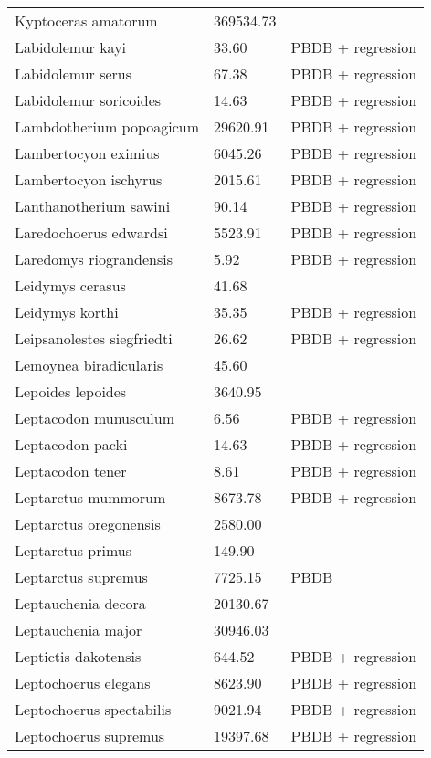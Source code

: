 \documentclass{article}
\begin{document}
\begin{center}
\begin{longtable}{p{} p{} p{} }
  Kyptoceras amatorum & 369534.73 & \cite{Tomiya2013} \\ 
  Labidolemur kayi & 33.60 & PBDB + regression \\ 
  Labidolemur serus & 67.38 & PBDB + regression \\ 
  Labidolemur soricoides & 14.63 & PBDB + regression \\ 
  Lambdotherium popoagicum & 29620.91 & PBDB + regression \\ 
  Lambertocyon eximius & 6045.26 & PBDB + regression \\ 
  Lambertocyon ischyrus & 2015.61 & PBDB + regression \\ 
  Lanthanotherium sawini & 90.14 & PBDB + regression \\ 
  Laredochoerus edwardsi & 5523.91 & PBDB + regression \\ 
  Laredomys riograndensis & 5.92 & PBDB + regression \\ 
  Leidymys cerasus & 41.68 & \cite{Tomiya2013} \\ 
  Leidymys korthi & 35.35 & PBDB + regression \\ 
  Leipsanolestes siegfriedti & 26.62 & PBDB + regression \\ 
  Lemoynea biradicularis & 45.60 & \cite{Tomiya2013} \\ 
  Lepoides lepoides & 3640.95 & \cite{Tomiya2013} \\ 
  Leptacodon munusculum & 6.56 & PBDB + regression \\ 
  Leptacodon packi & 14.63 & PBDB + regression \\ 
  Leptacodon tener & 8.61 & PBDB + regression \\ 
  Leptarctus mummorum & 8673.78 & PBDB + regression \\ 
  Leptarctus oregonensis & 2580.00 & \cite{McKenna2011} \\ 
  Leptarctus primus & 149.90 & \cite{Tomiya2013} \\ 
  Leptarctus supremus & 7725.15 & PBDB \\ 
  Leptauchenia decora & 20130.67 & \cite{Tomiya2013} \\ 
  Leptauchenia major & 30946.03 & \cite{Tomiya2013} \\ 
  Leptictis dakotensis & 644.52 & PBDB + regression \\ 
  Leptochoerus elegans & 8623.90 & PBDB + regression \\ 
  Leptochoerus spectabilis & 9021.94 & PBDB + regression \\ 
  Leptochoerus supremus & 19397.68 & PBDB + regression \\ 

\end{longtable}
\end{center}
\end{document}
